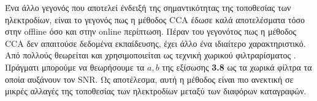 \documentclass[11pt,a4paper,english,greek,twoside]{../Thesis}
\begin{document}
\par Ένα άλλο γεγονός που αποτελεί ένδειξή της σημαντικότητας της τοποθεσίας των ηλεκτροδίων, είναι το γεγονός πως η μέθοδος CCA έδωσε καλά αποτελέσματα τόσο στην offline όσο και στην online περίπτωση. Πέραν του γεγονότος πως η μέθοδος CCA δεν απαιτούσε δεδομένα εκπαίδευσης, έχει άλλο ένα ιδιαίτερο χαρακτηριστικό. Από πολλούς θεωρείται και χρησιμοποιείται ως τεχνική χωρικού φιλτραρίσματος \cite{Spuler2014-wl}\cite{Clercq2006-jn}. Πράγματι μπορούμε να θεωρήσουμε τα $a,b$ της εξίσωσης \textbf{3.8} ως τα χωρικά φίλτρα τα οποία αυξάνουν τον SNR. Ως αποτέλεσμα, αυτή η μέθοδος είναι πιο ανεκτική σε μικρές αλλαγές της τοποθεσίας των ηλεκτροδίων μεταξύ των διαφόρων καταγραφών. 
\end{document}
